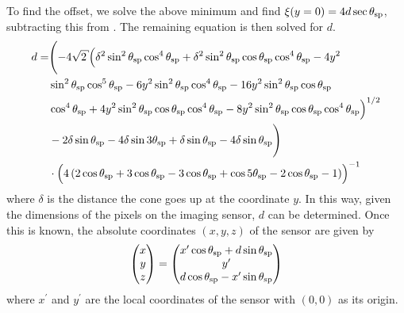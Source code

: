 To find the offset, we solve the above minimum and find $\xi(y=0) = 4 d
\sec\theta_\mathrm{sp}$, subtracting this from .  The remaining
equation is then solved for $d$.
\begin{align}
d =& \Biggl(-4 \sqrt{2} \Bigl(\delta^2 \sin ^2\thetasp \cos
^4\thetasp+\delta^2 \sin ^2\thetasp \cos \thetasp \cos ^4\thetasp-4 y^2 \nonumber \\
   & \sin ^2\thetasp \cos ^5\thetasp-6 y^2 \sin ^2\thetasp
     \cos ^4\thetasp-16 y^2 \sin ^2\thetasp \cos \thetasp \nonumber \\
  & \cos ^4\thetasp+4 y^2 \sin ^2\thetasp \cos \thetasp
    \cos ^4\thetasp-8 y^2 \sin ^2\thetasp \cos \thetasp \cos
    ^4\thetasp\Bigr)^{1/2} \nonumber \\
&-2 \delta\sin \thetasp-4 \delta \sin 3 \thetasp+\delta  \sin \thetasp-4 \delta \sin \thetasp\Biggr) \nonumber \\
&\cdot\Bigl(4 \left(2 \cos \thetasp+3 \cos \thetasp-3 \cos \thetasp+\cos 5 \thetasp-2 \cos \thetasp-1\right)\Bigr)^{-1}
\end{align}
where $\delta$ is the distance the cone goes up at the coordinate $y$.  
In this way, given the dimensions of the pixels on the imaging sensor, $d$
can be determined.  Once this is known, the absolute coordinates $(x,y,z)$ of the
sensor are given by 
\begin{equation}
	\begin{pmatrix} 
					x\\ 
					y\\ 
					z
	\end{pmatrix} 
	=
	\begin{pmatrix} 
					x^\prime \cos\theta_\mathrm{sp} + d \sin\theta_\mathrm{sp}\\ 
					y^\prime \\
					d \cos\theta_\mathrm{sp} - x^\prime \sin\theta_\mathrm{sp}\\ 
	\end{pmatrix} 
\label{eqn:sensorcoordinates}
\end{equation}
where $x^\prime$ and $y^\prime$ are the local coordinates of the sensor
with $(0,0)$ as its origin.
